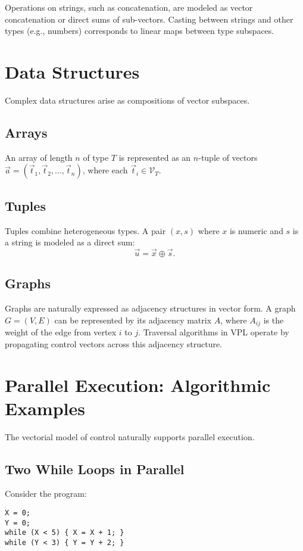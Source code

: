 \documentclass[12pt]{article}
\begin{document}
Operations on strings, such as concatenation, are modeled as vector
concatenation or direct sums of sub-vectors. Casting between strings and other
types (e.g., numbers) corresponds to linear maps between type subspaces.

\section{Data Structures}
Complex data structures arise as compositions of vector subspaces.

\subsection{Arrays}
An array of length $n$ of type $T$ is represented as an $n$-tuple of vectors
$\vec{a} = (\vec{t}_1, \vec{t}_2, \dots, \vec{t}_n)$, where each
$\vec{t}_i \in \mathcal{V}_T$.

\subsection{Tuples}
Tuples combine heterogeneous types. A pair $(x, s)$ where $x$ is numeric and
$s$ is a string is modeled as a direct sum:
\[
\vec{u} = \vec{x} \oplus \vec{s}.
\]

\subsection{Graphs}
Graphs are naturally expressed as adjacency structures in vector form. A graph
$G = (V,E)$ can be represented by its adjacency matrix $A$, where $A_{ij}$ is
the weight of the edge from vertex $i$ to $j$. Traversal algorithms in VPL
operate by propagating control vectors across this adjacency structure.

\section{Parallel Execution: Algorithmic Examples}
The vectorial model of control naturally supports parallel execution.

\subsection{Two While Loops in Parallel}
Consider the program:
\begin{verbatim}
X = 0;
Y = 0;
while (X < 5) { X = X + 1; }
while (Y < 3) { Y = Y + 2; }
\end{verbatim}
\end{document}
